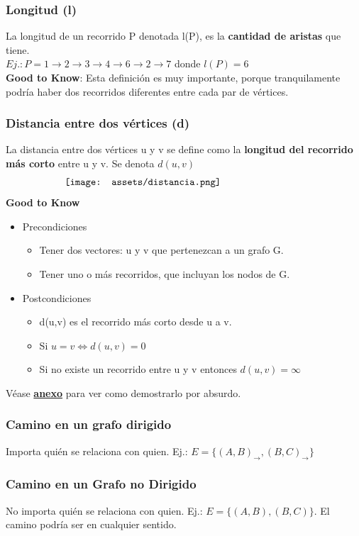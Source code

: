 \documentclass[10pt,a4paper]{article}
\begin{document}
\subsubsection*{Longitud (l)}
La longitud de un recorrido P denotada l(P), es la \textbf{cantidad de aristas} que tiene. \\
$Ej.: P = 1 \rightarrow 2 \rightarrow 3 \rightarrow 4 \rightarrow 6 \rightarrow 2 \rightarrow 7$ donde $l(P) = 6$ \\
\textbf{Good to Know}: Esta definición es muy importante, porque tranquilamente podría haber dos recorridos diferentes entre cada par de vértices.
\subsubsection*{Distancia entre dos vértices (d)}
La distancia entre dos vértices u y v se define como la \textbf{longitud del recorrido más corto} entre u y v. Se denota $d(u,v)$ 
\[\begin{minipage}[b]{0.7\textwidth}
    \texttt{[image: assets/distancia.png]}
\end{minipage}\]
\textbf{Good to Know} 
\begin{itemize}
    \item Precondiciones
    \begin{itemize}
        \item Tener dos vectores: u y v que pertenezcan a un grafo G.
        \item Tener uno o más recorridos, que incluyan los nodos de G.
    \end{itemize}
    \item Postcondiciones
    \begin{itemize}
        \item d(u,v) es el recorrido más corto desde u a v.
        \item Si $u=v \iff d(u,v) = 0$
        \item Si no existe un recorrido entre u y v entonces $d(u,v) = \infty$
    \end{itemize}
\end{itemize}
Véase \hyperref[subsubsec:distancia_demostracion]{\textbf{anexo}} para ver como demostrarlo por absurdo.
\subsubsection*{Camino en un grafo dirigido}
Importa quién se relaciona con quien. Ej.: $E = \{(A, B)_{\rightarrow}, (B, C)_{\rightarrow}\}$
\subsubsection*{Camino en un Grafo no Dirigido}
No importa quién se relaciona con quien. Ej.: $E = \{(A, B), (B, C)\}$. El camino podría ser en cualquier sentido. 
\end{document}
